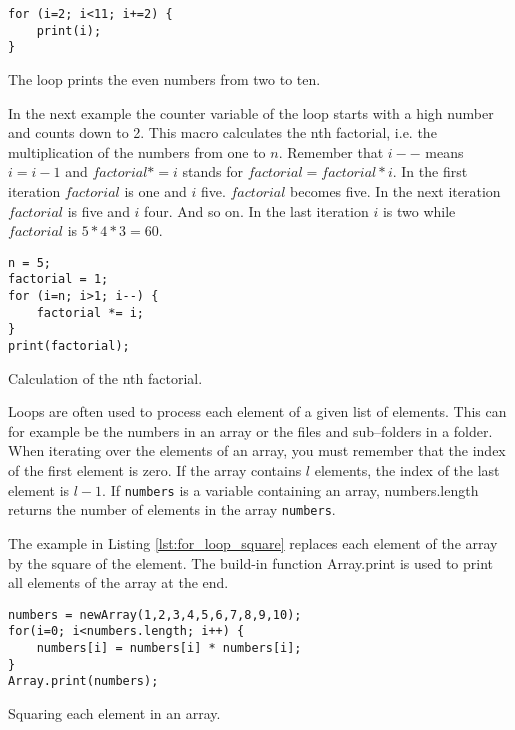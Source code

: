 \begin{listing}[H]
\begin{verbatim}
for (i=2; i<11; i+=2) {
	print(i);
}
\end{verbatim}
\caption{The loop prints the even numbers from two to ten.}
\label{lst:for_loop_even}
\end{listing}

In the next example the counter variable of the loop starts with a high number and counts down to 2. This macro calculates the nth factorial, i.e. the multiplication of the numbers from one to $n$. Remember that $i--$ means $i = i - 1$ and $factorial *= i$ stands for $factorial = factorial * i$. In the first iteration $factorial$ is one and $i$ five. $factorial$ becomes five. In the next iteration $factorial$ is five and $i$ four. And so on. In the last iteration $i$ is two while $factorial$ is $5 * 4 * 3 = 60$. 

\begin{listing}[H]
\begin{verbatim}
n = 5;
factorial = 1;
for (i=n; i>1; i--) {
	factorial *= i;
}
print(factorial);
\end{verbatim}
\caption{Calculation of the nth factorial.}
\label{lst:for_loop_factorial}
\end{listing}

Loops are often used to process each element of a given list of elements. This can for example be the numbers in an array or the files and sub--folders in a folder. When iterating over the elements of an array, you must remember that the index of the first element is zero. If the array contains $l$ elements, the index of the last element is $l-1$. If {\tt numbers} is a variable containing an array, {numbers.length} returns the number of elements in the array {\tt numbers}.

The example in Listing \ref{lst:for_loop_square} replaces each element of the array by the square of the element. The build-in function Array.print is used to print all elements of the array at the end. 

\begin{listing}[H]
\begin{verbatim}
numbers = newArray(1,2,3,4,5,6,7,8,9,10);
for(i=0; i<numbers.length; i++) {
	numbers[i] = numbers[i] * numbers[i];
}
Array.print(numbers);
\end{verbatim}
\caption{Squaring each element in an array.}
\label{lst:for_loop_square}
\end{listing}

